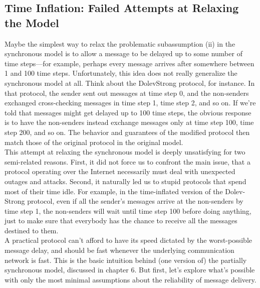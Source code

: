 \subsection{Time Inflation: Failed Attempts at Relaxing the Model}
Maybe the simplest way to relax the problematic subassumption (ii) in the synchronous
model is to allow a message to be delayed up to some number of time steps—for example,
perhaps every message arrives after somewhere between 1 and 100 time steps. Unfortunately,
this idea does not really generalize the synchronous model at all. Think about the DolevStrong protocol, for instance. In that protocol, the sender sent out messages at time step 0, and the non-senders exchanged cross-checking messages in time step 1, time step 2, and so
on. If we’re told that messages might get delayed up to 100 time steps, the obvious response
is to have the non-senders instead exchange messages only at time step 100, time step 200, and so on. The behavior and guarantees of the modified protocol then match those of the original protocol in the original model.\\
This attempt at relaxing the synchronous model is deeply unsatisfying for two semi-related reasons. First, it did not force us to confront the main issue, that a protocol operating over the Internet necessarily must deal with unexpected outages and attacks. Second, it
naturally led us to stupid protocols that spend most of their time idle. For example, in the
time-inflated version of the Dolev-Strong protocol, even if all the sender’s messages arrive
at the non-senders by time step 1, the non-senders will wait until time step 100 before
doing anything, just to make sure that everybody has the chance to receive all the messages
destined to them.\\
A practical protocol can’t afford to have its speed dictated by the worst-possible message
delay, and should be fast whenever the underlying communication network is fast. This is
the basic intuition behind (one version of) the partially synchronous model, discussed in
chapter 6. But first, let’s explore what’s possible with only the most minimal assumptions
about the reliability of message delivery.

